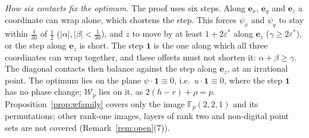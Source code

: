 \documentclass[11pt]{amsart}
\theoremstyle{definition}
\theoremstyle{plain}
\newcommand{\F}{\mathbb{F}}
\newcommand{\e}{\mathbf{e}}
\begin{document}
\emph{How six contacts fix the optimum.} The proof uses six steps. Along $\e_x$, $\e_y$ and $\e_z$ a coordinate can wrap alone, which shortens the step. This forces $\psi_x$ and $\psi_y$ to stay within $\frac1{30}$ of $\frac12$ ($|\alpha|,|\beta|<\frac1{30}$), and $z$ to move by at least $1+2\varepsilon^*$ along $\e_z$ ($\gamma\ge2\varepsilon^*$), or the step along $\e_z$ is short. The step $\mathbf 1$ is the one along which all three coordinates can wrap together, and these offsets must not shorten it: $\alpha+\beta\ge\gamma$. The diagonal contacts then balance against the step along $\e_z$, at an irrational point. The optimum lies on the plane $\psi\cdot\mathbf 1\equiv0$, i.e.\ $u\cdot\mathbf 1\equiv0$, where the step $\mathbf 1$ has no phase change; $\mathcal W_p$ lies on it, as $2(h-r)+\rho=p$. Proposition~\ref{prop:wfamily} covers only the image $\F_p(2,2,1)$ and its permutations; other rank-one images, layers of rank two and non-digital point sets are not covered (Remark~\ref{rem:open}(7)).
\end{document}
